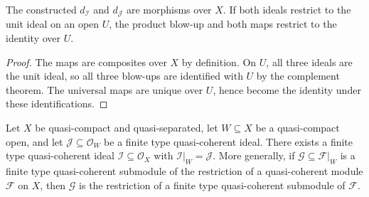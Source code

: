 \begin{corollary}
  \label{cor:nagata-blowup-product-common-refinement}
  \leanok

  The constructed $d_{\mathcal I}$ and $d_{\mathcal J}$ are morphisms over
  $X$.  If both ideals restrict to the unit ideal on an open $U$, the product
  blow-up and both maps restrict to the identity over $U$.
\end{corollary}

\begin{proof}
  \leanok
  The maps are composites over $X$ by definition.  On $U$, all three ideals
  are the unit ideal, so all three blow-ups are identified with $U$ by the
  complement theorem.  The universal maps are unique over $U$, hence become
  the identity under these identifications.
\end{proof}


\begin{lemma}
  \label{lemma:nagata-finite-type-ideal-extension-exists}
  \leanok

  Let $X$ be quasi-compact and quasi-separated, let $W\subseteq X$ be a
  quasi-compact open, and let
  $\mathcal J\subseteq\mathcal O_W$ be a finite type quasi-coherent ideal.
  There exists a finite type quasi-coherent ideal
  $\mathcal I\subseteq\mathcal O_X$ with
  $\mathcal I|_W=\mathcal J$.
  More generally, if $\mathcal G\subseteq\mathcal F|_W$ is a finite type
  quasi-coherent submodule of the restriction of a quasi-coherent module
  $\mathcal F$ on $X$, then $\mathcal G$ is the restriction of a finite type
  quasi-coherent submodule of $\mathcal F$.
\end{lemma}

